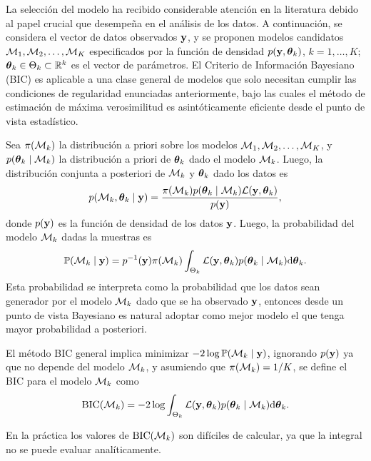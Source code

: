 La selección del modelo ha recibido considerable atención en la literatura debido al papel crucial que desempeña en el análisis de los datos. A continuación, se considera el vector de datos observados $\mathbf{y}$, y se proponen modelos candidatos $\mathcal{M}_1, \mathcal{M}_2, \ldots, \mathcal{M}_K$ especificados por la función de densidad $p(\mathbf{y},\boldsymbol{\theta}_k)$, $k=1,\ldots, K$; $\boldsymbol{\theta}_k\in\Theta_k\subset\mathbb{R}^k$ es el vector de parámetros. El Criterio de Información Bayesiano (BIC) es aplicable a una clase general de modelos que solo necesitan cumplir las condiciones de regularidad enunciadas anteriormente, bajo las cuales el método de estimación de máxima verosimilitud es asintóticamente eficiente desde el punto de vista estadístico.


Sea $\pi(\mathcal{M}_k)$ la distribución a priori sobre los modelos $\mathcal{M}_1, \mathcal{M}_2, \ldots, \mathcal{M}_K$,  y $p(\boldsymbol{\theta}_k\mid\mathcal{M}_k)$ la distribución a priori de $\boldsymbol{\theta}_k$ dado el modelo $\mathcal{M}_k$. Luego, la distribución conjunta a posteriori de $\mathcal{M}_k$ y $\boldsymbol{\theta}_k$ dado los datos es
\begin{equation}
	p(\mathcal{M}_k,\boldsymbol{\theta}_k \mid \mathbf{y}) = \frac{\pi(\mathcal{M}_k)p(\boldsymbol{\theta}_k\mid\mathcal{M}_k)\mathcal{L}(\mathbf{y},\boldsymbol{\theta}_k)}{p(\mathbf{y})},
	\label{eq:MLE7}
\end{equation}
donde $p(\mathbf{y})$ es la función de densidad de los datos $\mathbf{y}$. Luego, la probabilidad del modelo $\mathcal{M}_k$ dadas la muestras es
\begin{equation}
	\mathbb{P}(\mathcal{M}_k\mid\mathbf{y}) = p^{-1}(\mathbf{y})\pi(\mathcal{M}_k)\int_{\Theta_k}\mathcal{L}(\mathbf{y}, \boldsymbol{\theta}_k)p(\boldsymbol{\theta}_k\mid\mathcal{M}_k)\mathrm{d}\boldsymbol{\theta}_k.
	\label{eq:MLE8}
\end{equation}
Esta probabilidad se interpreta como la probabilidad que los datos sean generador por el modelo $\mathcal{M}_k$ dado que se ha observado $\mathbf{y}$, entonces desde un punto de vista Bayesiano  es natural adoptar como mejor modelo el que tenga mayor probabilidad a posteriori.

El método BIC general implica minimizar $-2\log\mathbb{P}(\mathcal{M}_k\mid\mathbf{y})$, ignorando $p(\mathbf{y})$ ya que no depende del modelo $\mathcal{M}_k$, y asumiendo que $\pi(\mathcal{M}_k)=1/K$, se define el BIC para el modelo $\mathcal{M}_k$ como
\begin{equation}
	\mathrm{BIC}(\mathcal{M}_k) = -2\log\int_{\Theta_k}\mathcal{L}(\mathbf{y}, \boldsymbol{\theta}_k)p(\boldsymbol{\theta}_k\mid\mathcal{M}_k)\mathrm{d}\boldsymbol{\theta}_k.
	\label{eq:MLE9}
\end{equation}

En la práctica los valores de $\mathrm{BIC}(\mathcal{M}_k)$ son difíciles de calcular, ya que la integral no se puede evaluar analíticamente.

